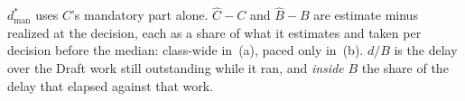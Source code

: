\begin{table}[t]
{  %
  \par\vspace{3pt}
  {\tiny\raggedright
  $d^{*}_{\mathrm{man}}$ uses $C$'s mandatory part alone.  $\hat{C}-C$ and
  $\hat{B}-B$ are estimate minus realized at the decision, each as a share of
  what it estimates and taken per decision before the median: class-wide in~(a),
  paced only in~(b).  $d/B$ is the delay over the Draft work still outstanding
  while it ran, and \emph{inside} $B$ the share of the delay that elapsed
  against that work.\par}
  }
\end{table}

